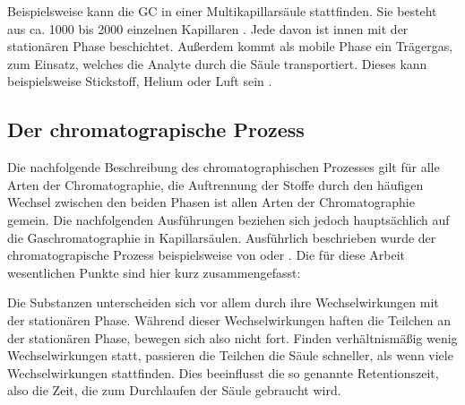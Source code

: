 Beispielsweise kann die GC in einer Multikapillarsäule stattfinden. Sie besteht aus ca. 1000 bis 2000 einzelnen Kapillaren \citep{obinski1999, Baumbach2009}. Jede davon ist innen mit der stationären Phase beschichtet. Außerdem kommt als mobile Phase ein Trägergas, zum Einsatz, welches die Analyte durch die Säule transportiert. Dieses kann beispielsweise Stickstoff, Helium \citep{obinski1999} oder Luft sein \citep{Baumbach2009}.

\subsection{Der chromatograpische Prozess}

Die nachfolgende Beschreibung des chromatographischen Prozesses gilt für alle Arten der Chromatographie, die Auftrennung der Stoffe durch den häufigen Wechsel zwischen den beiden Phasen ist allen Arten der Chromatographie gemein. Die nachfolgenden Ausführungen beziehen sich jedoch hauptsächlich auf die Gaschromatographie in Kapillarsäulen.
Ausführlich beschrieben wurde der chromatograpische Prozess beispielsweise von \cite{kolb2003} oder \cite{kaltenboeck2008}.
Die für diese Arbeit wesentlichen Punkte sind hier kurz zusammengefasst:

Die Substanzen unterscheiden sich vor allem durch ihre Wechselwirkungen mit der stationären Phase. Während dieser Wechselwirkungen haften die Teilchen an der stationären Phase, bewegen sich also nicht fort. Finden verhältnismäßig wenig Wechselwirkungen statt, passieren die Teilchen die Säule schneller, als wenn viele Wechselwirkungen stattfinden. Dies beeinflusst die so genannte Retentionszeit, also die Zeit, die zum Durchlaufen der Säule gebraucht wird.


